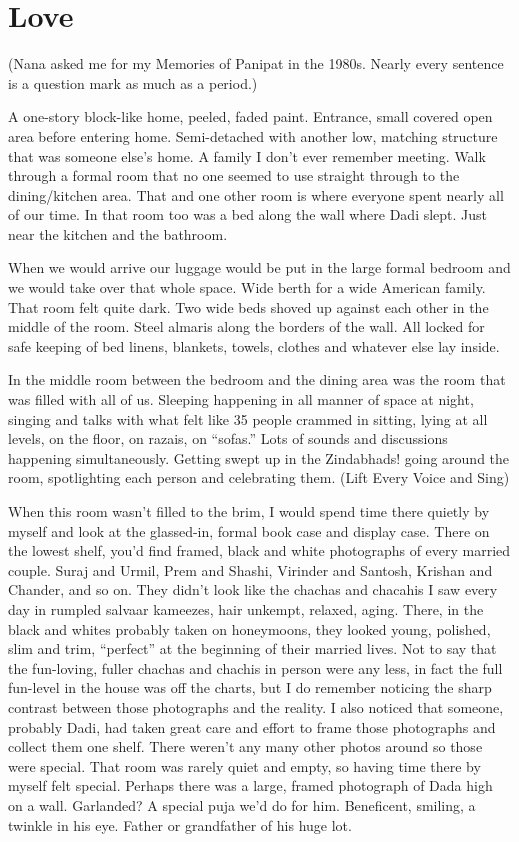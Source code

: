 \chapter{Love}

(Nana asked me for my Memories of Panipat in the 1980s. Nearly every sentence is a question mark as much as a period.)

A one-story block-like home, peeled, faded paint. Entrance, small covered open area before entering home. Semi-detached with another low, matching structure that was someone else’s home. A family I don’t ever remember meeting. Walk through a formal room that no one seemed to use straight through to the dining/kitchen area. That and one other room is where everyone spent nearly all of our time. In that room too was a bed along the wall where Dadi slept. Just near the kitchen and the bathroom.

When we would arrive our luggage would be put in the large formal bedroom and we would take over that whole space. Wide berth for a wide American family. That room felt quite dark. Two wide beds shoved up against each other in the middle of the room. Steel almaris along the borders of the wall. All locked for safe keeping of bed linens, blankets, towels, clothes and whatever else lay inside.

In the middle room between the bedroom and the dining area was the room that was filled with all of us. Sleeping happening in all manner of space at night, singing and talks with what felt like 35 people crammed in sitting, lying at all levels, on the floor, on razais, on “sofas.” Lots of sounds and discussions happening simultaneously. Getting swept up in the Zindabhads! going around the room, spotlighting each person and celebrating them. (Lift Every Voice and Sing)

When this room wasn’t filled to the brim, I would spend time there quietly by myself and look at the glassed-in, formal book case and display case. There on the lowest shelf, you’d find framed, black and white photographs of every married couple. Suraj and Urmil, Prem and Shashi, Virinder and Santosh, Krishan and Chander, and so on. They didn’t look like the chachas and chacahis I saw every day in rumpled salvaar kameezes, hair unkempt, relaxed, aging. There, in the black and whites probably taken on honeymoons, they looked young, polished, slim and trim, “perfect” at the beginning of their married lives. Not to say that the fun-loving, fuller chachas and chachis in person were any less, in fact the full fun-level in the house was off the charts, but I do remember noticing the sharp contrast between those photographs and the reality. I also noticed that someone, probably Dadi, had taken great care and effort to frame those photographs and collect them one shelf. There weren’t any many other photos around so those were special. That room was rarely quiet and empty, so having time there by myself felt special. Perhaps there was a large, framed photograph of Dada high on a wall. Garlanded? A special puja we’d do for him. Beneficent, smiling, a twinkle in his eye. Father or grandfather of his huge lot.

